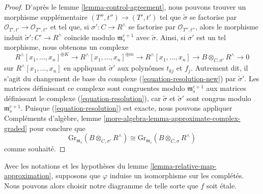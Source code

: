 \begin{proof}
\medskip\noindent
D'après le lemme \ref{lemma-control-agreement},
nous pouvons trouver un morphisme supplémentaire $(T'', t'') \to (T', t')$
tel que $\tilde\sigma$
se factorise par $\mathcal{O}_{T', t'} \to \mathcal{O}_{T'', t''}$
et tel que, si $\sigma' : C \to R^\wedge$
se factorise par $\mathcal{O}_{T'', t''}$, alors le morphisme induit
$\tilde \sigma' : C' \to R^\wedge$
coïncide modulo $\mathfrak m_s^{c + 1}$ avec $\tilde \sigma$.
Ainsi, si $\sigma'$ est un tel morphisme, nous obtenons un complexe
$$
R^\wedge[x_1, \ldots, x_n]^{\oplus K} \to
R^\wedge[x_1, \ldots, x_n]^{\oplus m} \to
R^\wedge[x_1, \ldots, x_n] \to B \otimes_{C, \sigma'} R^\wedge \to 0
$$
sur $R^\wedge[x_1, \ldots, x_n]$ en appliquant $\tilde\sigma'$
aux polynômes $t_{kj}$ et $f_j$. Autrement dit, il
s'agit du changement de base du complexe (\ref{equation-resolution-new})
par $\tilde\sigma'$. Les matrices définissant ce complexe
sont congruentes modulo $\mathfrak m_s^{c + 1}$ aux matrices
définissant le complexe (\ref{equation-resolution}), car
$\tilde \sigma$ et $\tilde \sigma'$ sont congrus modulo
$\mathfrak m_s^{c + 1}$. Puisque (\ref{equation-resolution}) est exacte,
nous pouvons appliquer
Compléments d'algèbre, lemme \ref{more-algebra-lemma-approximate-complex-graded}
pour conclure que
$$
\text{Gr}_{\mathfrak m_s}(B \otimes_{C, \sigma'} R^\wedge)
\cong
\text{Gr}_{\mathfrak m_s}(B \otimes_{C, \sigma} R^\wedge)
$$
comme souhaité.
\end{proof}

\begin{lemma}
\label{lemma-relative-isomorphism-approximation}
Avec les notations et les hypothèses du lemme \ref{lemma-relative-map-approximation},
supposons que $\varphi$ induise un isomorphisme sur les complétés.
Nous pouvons alors choisir notre diagramme de telle sorte que $f$ soit \'etale.
\end{lemma}

